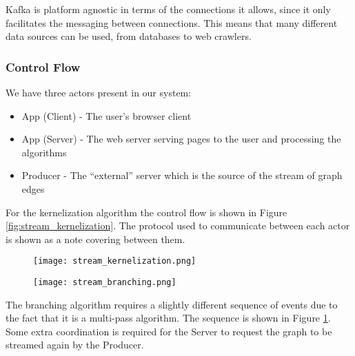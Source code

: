 Kafka is platform agnostic in terms of the connections it allows, since it only
facilitates the messaging between connections. This means that many different
data sources can be used, from databases to web crawlers.

\subsubsection{Control Flow}

We have three actors present in our system:

\begin{itemize}
    \item
          App (Client) - The user's browser client
    \item
          App (Server) - The web server serving pages to the user and
          processing the algorithms
    \item
          Producer - The ``external'' server which is the source of the stream
          of graph edges
\end{itemize}

For the kernelization algorithm the control flow is shown in Figure
\ref{fig:stream_kernelization}. The protocol used to communicate between each
actor is shown as a note covering between them.

\begin{figure}[H]
    \centering
    \begin{minipage}{.5\textwidth}
        \centering
        \texttt{[image: stream\_kernelization.png]}
        \label{fig:stream_kernelization}
    \end{minipage}%
    \begin{minipage}{.5\textwidth}
        \centering
        \texttt{[image: stream\_branching.png]}
        \label{fig:stream_branching}
    \end{minipage}
\end{figure}

The branching algorithm requires a slightly different sequence of events due to
the fact that it is a multi-pass algorithm. The sequence is shown in Figure
\ref{fig:stream_branching}. Some extra coordination is required for the Server
to request the graph to be streamed again by the Producer.

